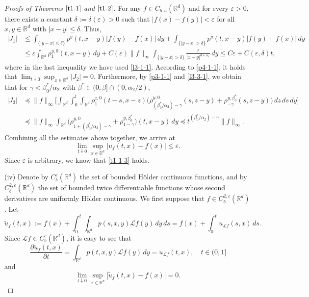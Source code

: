 \documentclass[a4paper,11pt]{amsart}
\renewcommand{\le}{\leqslant}
\newcommand{\R}{\mathds R}
\newcommand{\B}{\beta}
\newcommand{\p}{\preceq}
\newcommand{\A}{\alpha}
\newcommand{\G}{\gamma}
\newcommand{\e}{ \varepsilon}
\def\LL{{\mathcal L}}
\theoremstyle{definition}
\begin{document}
\begin{proof}[Proofs of Theorems $\ref{t1-1}$ and $\ref{t1-2}$]
For any $f\in C_{b,u}(\R^d)$ and for every $\e>0$, there exists
a constant $\delta:=\delta(\e)>0$ such that $|f(x)-f(y)|<\e$ for all $x,y \in \R^d$ with
$|x-y|\le \delta$. Thus,
\begin{align*}
|J_1|&\le \int_{\{|y-x|\le \delta\}}p^y(t,x-y)|f(y)-f(x)|\,dy+
\int_{\{|y-x|>\delta\}}p^y(t,x-y)|f(y)-f(x)|\,dy\\
&\le \e \int_{\R^d}\rho^{y,0}_1(t,x-y)\,dy+
C(\e)\|f\|_{\infty}\int_{\{|y-x|>\delta\}}\frac{t}{|x-y|^{d+\A_1}}\,dy\le C\e+C(\e,\delta)t,
\end{align*}
where in the last inequality we have used \eqref{l3-1-1}.
According to \eqref{p4-1-1}, it holds that $\lim_{t \downarrow 0}\sup_{x \in \R^d}|J_2|=0$.
Furthermore, by \eqref{p3-1-1} and \eqref{l3-3-1}, we obtain that for $\G<\B_0^*/{\A_2}$ with $\B^*\in (0,\B]\cap(0,\A_2/2)$,
\begin{align*}
|J_3|&\p \|f\|_{\infty}\Bigg[\int_{\R^d}
\int_0^t\int_{\R^d}\rho^{z,0}_1(t-s,x-z)
\Big(\rho^{y,0}_{{(\B_0^*/\A_2)}-\G}(s,z-y)+ \rho^{y,\B_0^*}_{-\G}(s,z-y)\Big)\,dz\,ds\,dy\Bigg]\\
&\p \|f\|_{\infty}\int_{\R^d}
\Big(\rho^{y,0}_{1+{(\B_0^*/\A_2)}-\G}+\rho^{y,\B_0^*}_{1-\G}\Big)(t,x-y)\,dy\p t^{{(\B_0^*/\A_2)}-\G}\|f\|_{\infty}.
\end{align*}
Combining all the estimates above together, we arrive at
\begin{equation*}
\lim_{t \downarrow 0}\sup_{x \in \R^d}\big|u_f(t,x)-f(x)\big|\le \e.
\end{equation*}
Since $\e$ is arbitrary, we know that \eqref{t1-1-3} holds.

\smallskip

(iv) Denote by $C_{b}^{\varepsilon}(\R^d)$ the set of bounded H\"{o}lder continuous functions, and by $C_{b}^{2,\varepsilon}(\R^d)$ the set of bounded twice differentiable functions whose second derivatives are uniformly H\"{o}lder continuous.  We first suppose that $f \in C_{b}^{2,\varepsilon}(\R^d)$. Let
\begin{equation*}
\tilde u_f(t,x):=f(x)+\int_0^t\int_{\R^d}p(s,x,y)\LL f(y)\,dy\,ds=f(x)+\int_0^t
u_{\LL f}(s,x)\,ds.
\end{equation*}
Since $\LL f \in C_{b}^{\varepsilon}(\R^d)$, it is easy to see that
\begin{equation*}
\frac{\partial \tilde u_f(t,x)}{\partial t}=\int_{\R^d}p(t,x,y)\LL f(y)\,dy
=u_{\LL f}(t,x),\quad t\in (0,1]
\end{equation*} and
\begin{equation*}
\lim_{t \downarrow 0}\sup_{x\in\R^d}|\tilde u_f(t,x)-f(x)|=0.
\end{equation*}


\end{proof}
\end{document}
